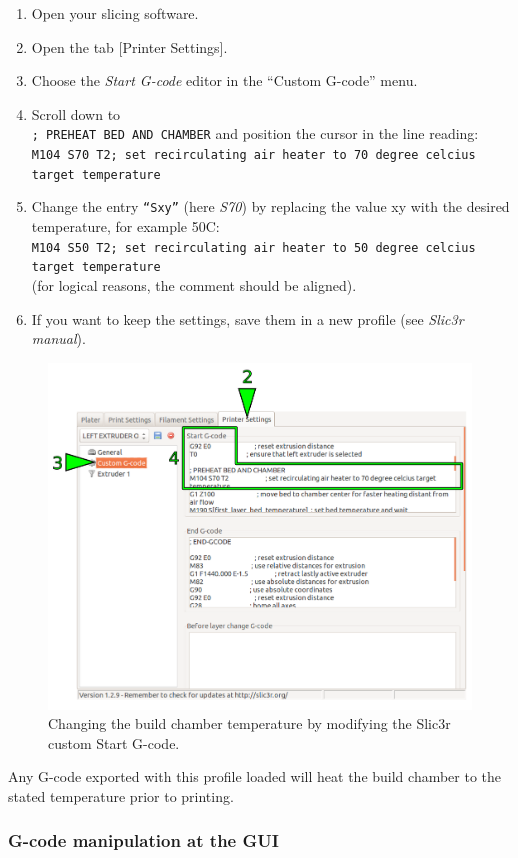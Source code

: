 \begin{enumerate}
  \item Open your slicing software.
  \item Open the tab [Printer Settings].
  \item Choose the \emph{Start G-code} editor in the “Custom G-code” menu.
  \item Scroll down to\\
        \verb|; PREHEAT BED AND CHAMBER|
        and position the cursor in the line reading:\\
        \verb|M104 S70 T2; set recirculating air heater to 70 degree celcius target temperature|
  \item Change the entry \verb|“Sxy”| (here \emph{S70}) by replacing the value xy with the desired 
        temperature, for example 50\degree C:\\
        \verb|M104 S50 T2; set recirculating air heater to 50 degree celcius target temperature|\\
        (for logical reasons, the comment should be aligned).
  \item If you want to keep the settings, save them in a new profile 
        (see \emph{Slic3r manual}).
\end{enumerate}

\begin{figure}[H]
  \centering
  \includegraphics[width=.7\linewidth]{./img/tt_slic3r_modify_startendgcode.png}
  \caption{Changing the build chamber temperature by modifying the Slic3r custom Start 
           G-code.}
\end{figure}

Any G-code exported with this profile loaded will heat the build chamber to the stated temperature prior to printing. 


\subsubsection{G-code manipulation at the GUI}

